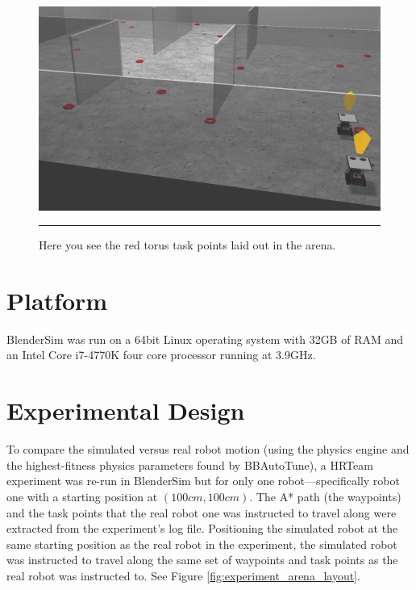 \begin{figure}[htbp]
\centering
\includegraphics[scale=0.32]{../Figures/Chapter5/taskPoints.png}
\rule{35em}{0.5pt}
\caption[Simulated Task Points]{Here you see the red torus task points laid out in the arena.}
\label{fig:task_points}
\end{figure}

\section{Platform}

BlenderSim was run on a 64bit Linux operating system with 32GB of RAM and an Intel Core i7-4770K four core processor running at 3.9GHz.

\newpage

\section{Experimental Design}

To compare the simulated versus real robot motion (using the physics engine and the highest-fitness physics parameters found by BBAutoTune), a HRTeam experiment was re-run in BlenderSim but for only one robot---specifically robot one with a starting position at $(100cm,100cm)$. The A* path (the waypoints) and the task points that the real robot one was instructed to travel along were extracted from the experiment's log file. Positioning the simulated robot at the same starting position as the real robot in the experiment, the simulated robot was instructed to travel along the same set of waypoints and task points as the real robot was instructed to. See Figure \ref{fig:experiment_arena_layout}.

